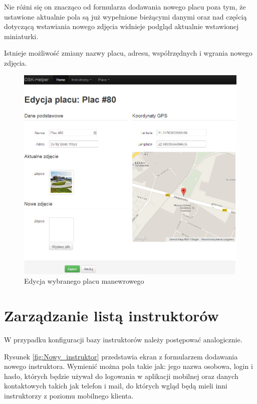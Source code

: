 \documentclass[twoside,a4paper,openright,12pt]{book}
\begin{document}
Nie różni się on znacząco od formularza dodawania nowego placu poza tym, że ustawione aktualnie pola są już wypełnione bieżącymi danymi oraz nad częścią dotyczącą wstawiania nowego zdjęcia widnieje podgląd aktualnie wstawionej miniaturki.

Istnieje możliwość zmiany nazwy placu, adresu, współrzędnych i wgrania nowego zdjęcia.

\begin{figure}[h!]
\centering
\includegraphics[width=1\textwidth]{screenshots/panel/edycja_placu.png}
\caption{Edycja wybranego placu manewrowego}
\label{fig:Edycja_placu}
\end{figure}

\newpage
\section{Zarządzanie listą instruktorów}

W przypadku konfiguracji bazy instruktorów należy postępować analogicznie.

Rysunek \ref{fig:Nowy_instruktor} przedstawia ekran z formularzem dodawania nowego instruktora. Wymienić można pola takie jak: jego nazwa osobowa, login i hasło, których będzie używał do logowania w aplikacji mobilnej oraz danych kontaktowych takich jak telefon i mail, do których wgląd będą mieli inni instruktorzy z poziomu mobilnego klienta.
\end{document}
